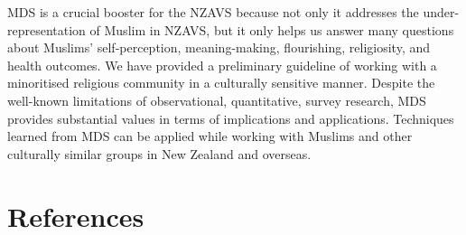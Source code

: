 \documentclass[
]{interact}
\newlength{\cslhangindent}
\newenvironment{CSLReferences}[2] %
 {\begin{list}{}{%
  \setlength{\itemindent}{0pt}
  \setlength{\leftmargin}{0pt}
  \setlength{\parsep}{0pt}
  \ifodd #1
   \setlength{\leftmargin}{\cslhangindent}
   \setlength{\itemindent}{-1\cslhangindent}
  \fi
  \setlength{\itemsep}{#2\baselineskip}}}
 {\end{list}}
\begin{document}
MDS is a crucial booster for the NZAVS because not only it addresses the
under-representation of Muslim in NZAVS, but it only helps us answer
many questions about Muslims' self-perception, meaning-making,
flourishing, religiosity, and health outcomes. We have provided a
preliminary guideline of working with a minoritised religious community
in a culturally sensitive manner. Despite the well-known limitations of
observational, quantitative, survey research, MDS provides substantial
values in terms of implications and applications. Techniques learned
from MDS can be applied while working with Muslims and other culturally
similar groups in New Zealand and overseas.

\newpage{}

\section*{References}\label{references}

\label{refs}
\begin{CSLReferences}{0}{1}
\end{CSLReferences}
\end{document}
